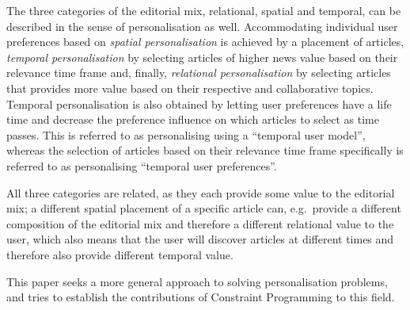 The three categories of the editorial mix, relational, spatial and temporal, can be described in the sense of personalisation as well. Accommodating individual user preferences based on \emph{spatial personalisation} is achieved by a placement of articles, \emph{temporal personalisation} by selecting articles of higher news value based on their relevance time frame and, finally, \emph{relational personalisation} by selecting articles that provides more value based on their respective and collaborative topics. Temporal personalisation is also obtained by letting user preferences have a life time and decrease the preference influence on which articles to select as time passes. This is referred to as personalising using a ``temporal user model'', whereas the selection of articles based on their relevance time frame specifically is referred to as personalising ``temporal user preferences''.

All three categories are related, as they each provide some value to the editorial mix; a different spatial placement of a specific article can, e.g.\ provide a different composition of the editorial mix and therefore a different relational value to the user, which also means that the user will discover articles at different times and therefore also provide different temporal value.

This paper seeks a more general approach to solving personalisation problems, and tries to establish the contributions of Constraint Programming to this field.

